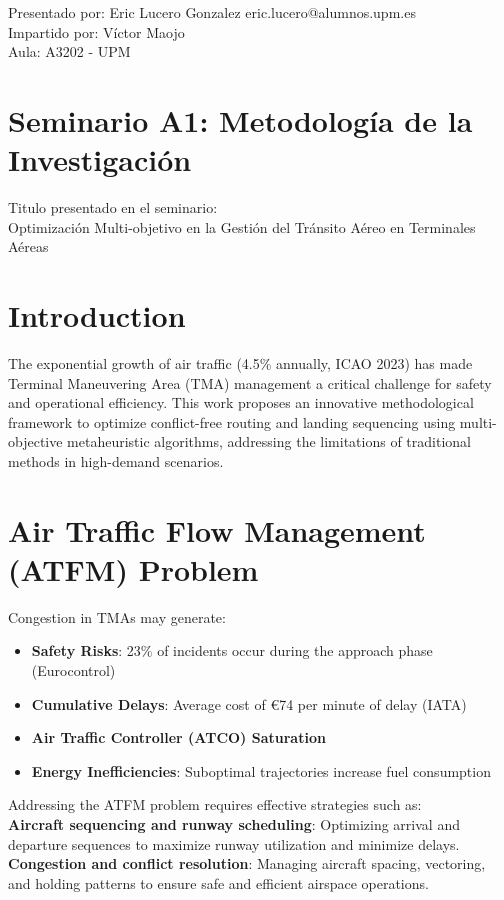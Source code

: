 \begin{flushleft}
    {\color{gray} Presentado por: Eric Lucero Gonzalez \hfill eric.lucero@alumnos.upm.es} \\
    {\color{gray} Impartido por: Víctor Maojo \\Aula: A3202 - UPM}
    \section{Seminario A1: Metodología de la Investigación}
    Titulo presentado en el seminario:\\
    {\normalsize Optimización Multi-objetivo en la Gestión del Tránsito Aéreo en Terminales Aéreas} \\
\end{flushleft}
\begin{minipage}{0.47\textwidth}
    \section{Introduction}
    The exponential growth of air traffic (4.5\% annually, ICAO 2023) has made Terminal Maneuvering Area (TMA) management a critical challenge for safety and operational efficiency. This work proposes an innovative methodological framework to optimize conflict-free routing and landing sequencing using multi-objective metaheuristic algorithms, addressing the limitations of traditional methods in high-demand scenarios.

    \section{Air Traffic Flow Management (ATFM) Problem}
    Congestion in TMAs may generate:
    \begin{itemize}[itemsep=1mm]\small
        \item \textbf{Safety Risks}: 23\% of incidents occur during the approach phase (Eurocontrol)
        \item \textbf{Cumulative Delays}: Average cost of €74 per minute of delay (IATA)
        \item \textbf{Air Traffic Controller (ATCO) Saturation}%
        \item \textbf{Energy Inefficiencies}: Suboptimal trajectories increase fuel consumption
    \end{itemize}
    Addressing the ATFM problem requires effective strategies such as:\\
    \textbf{Aircraft sequencing and runway scheduling}: Optimizing arrival and departure sequences to maximize runway utilization and minimize delays.\\
    \textbf{Congestion and conflict resolution}: Managing aircraft spacing, vectoring, and holding patterns to ensure safe and efficient airspace operations.
\end{minipage}
